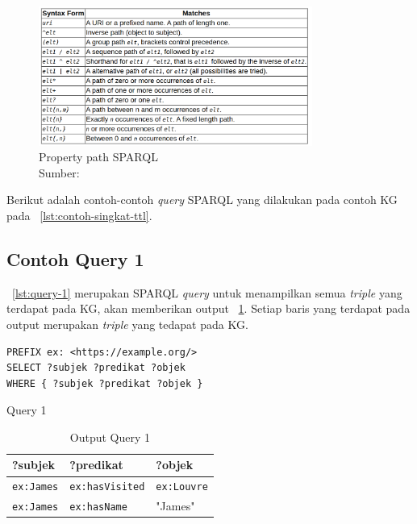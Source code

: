 \begin{figure}[H]
  \centering
  \includegraphics[width=0.8\textwidth]{pictures/pp.png}
  \caption[Property path SPARQL]{Property path SPARQL\\Sumber: \citep{sparql}}
  \label{fig:pp}
\end{figure}

Berikut adalah contoh-contoh \textit{query} SPARQL yang dilakukan pada contoh KG pada
\lst~\ref{lst:contoh-singkat-ttl}.

\subsection{Contoh Query 1}
\label{sec:contoh-query-1}

\lst~\ref{lst:query-1} merupakan SPARQL \textit{query} untuk menampilkan semua \textit{triple} yang terdapat
pada KG, akan memberikan output \tab~\ref{tab:output-query-1}. Setiap baris yang terdapat pada
output merupakan \textit{triple} yang tedapat pada KG.

\begin{listing}[H]
  \begin{verbatim}
PREFIX ex: <https://example.org/>
SELECT ?subjek ?predikat ?objek
WHERE { ?subjek ?predikat ?objek }
  \end{verbatim}
  \caption{Query 1}
  \label{lst:query-1}
\end{listing}


\begin{table}
  \centering
  \begin{tabular}{|l|l|l|} \hline
    ?subjek           & ?predikat              & ?objek             \\\hline \hline
    \texttt{ex:James} & \texttt{ex:hasVisited} & \texttt{ex:Louvre} \\\hline
    \texttt{ex:James} & \texttt{ex:hasName}    & "James"            \\\hline
  \end{tabular}
  \caption{Output Query 1}
  \label{tab:output-query-1}
\end{table}

